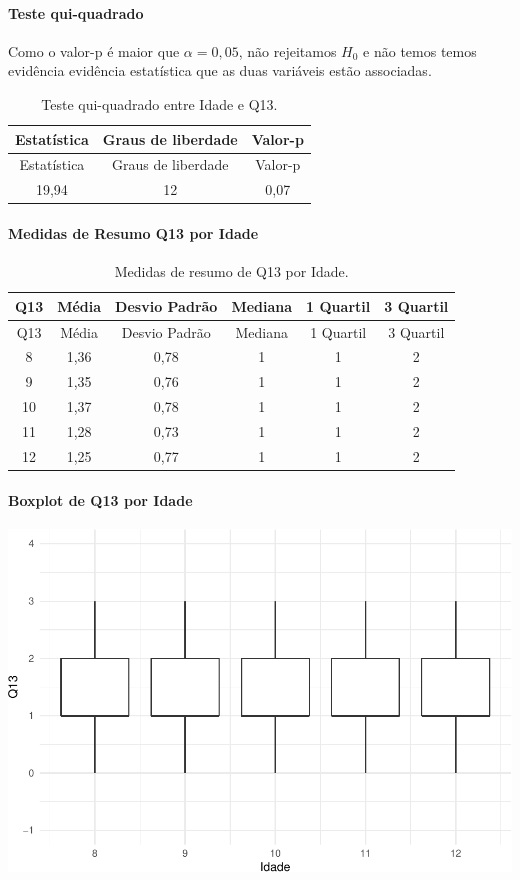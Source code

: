 \documentclass[]{article}
\let\oldparagraph\paragraph
\renewcommand{\paragraph}[1]{\oldparagraph{#1}\mbox{}}
\begin{document}
\hypertarget{teste-qui-quadrado-9}{%
\paragraph{Teste qui-quadrado}\label{teste-qui-quadrado-9}}

Como o valor-p é maior que \(\alpha=0,05\), não rejeitamos \(H_0\) e não temos temos evidência evidência estatística que as duas variáveis estão associadas.

\begin{longtable}[]{@{}ccc@{}}
\caption{\label{tab:unnamed-chunk-71}Teste qui-quadrado entre Idade e Q13.}\tabularnewline
\toprule
Estatística & Graus de liberdade & Valor-p\tabularnewline
\midrule
\endfirsthead
\toprule
Estatística & Graus de liberdade & Valor-p\tabularnewline
\midrule
\endhead
19,94 & 12 & 0,07\tabularnewline
\bottomrule
\end{longtable}

\cleardoublepage

\hypertarget{medidas-de-resumo-q13-por-idade}{%
\paragraph{Medidas de Resumo Q13 por Idade}\label{medidas-de-resumo-q13-por-idade}}

\begin{longtable}[]{@{}cccccc@{}}
\caption{\label{tab:unnamed-chunk-72}Medidas de resumo de Q13 por Idade.}\tabularnewline
\toprule
Q13 & Média & Desvio Padrão & Mediana & 1 Quartil & 3 Quartil\tabularnewline
\midrule
\endfirsthead
\toprule
Q13 & Média & Desvio Padrão & Mediana & 1 Quartil & 3 Quartil\tabularnewline
\midrule
\endhead
8 & 1,36 & 0,78 & 1 & 1 & 2\tabularnewline
9 & 1,35 & 0,76 & 1 & 1 & 2\tabularnewline
10 & 1,37 & 0,78 & 1 & 1 & 2\tabularnewline
11 & 1,28 & 0,73 & 1 & 1 & 2\tabularnewline
12 & 1,25 & 0,77 & 1 & 1 & 2\tabularnewline
\bottomrule
\end{longtable}

\hypertarget{boxplot-de-q13-por-idade}{%
\paragraph{Boxplot de Q13 por Idade}\label{boxplot-de-q13-por-idade}}

\begin{center}\includegraphics[width=0.75\linewidth]{relatorio_files/figure-latex/unnamed-chunk-73-1} \end{center}
\end{document}
